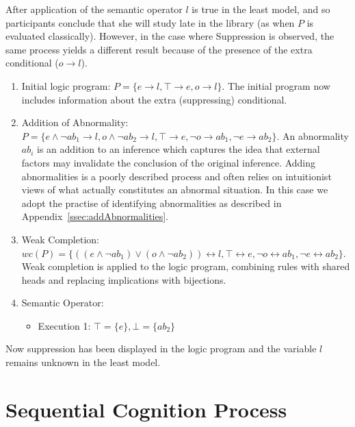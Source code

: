 \documentclass{article}
\begin{document}
After application of the semantic operator $l$ is true in the least model, and so participants conclude that she will study late in the library (as when $P$ is evaluated classically). However, in the case where Suppression is observed, the same process yields a different result because of the presence of the extra conditional ($o\rightarrow l$).
\begin{enumerate}
\item Initial logic program: $P = \{e \rightarrow l, \top \rightarrow e, o \rightarrow l \}$. The initial program now includes information about the extra (suppressing) conditional.
\item Addition of Abnormality: $P = \{e \land \lnot ab_1 \rightarrow l, o \land \lnot ab_2 \rightarrow l, \top \rightarrow e, \lnot o \rightarrow ab_1, \lnot e \rightarrow ab_2 \}$. An abnormality $ab_i$ is an addition to an inference which captures the idea that external factors may invalidate the conclusion of the original inference. Adding abnormalities is a poorly described process and often relies on intuitionist views of what actually constitutes an abnormal situation. In this case we adopt the practise of identifying abnormalities as described in Appendix~\ref{ssec:addAbnormalities}.
\item Weak Completion: $wc(P) = \{((e \land \lnot ab_1) \lor (o \land \lnot ab_2)) \leftrightarrow l, \top \leftrightarrow e, \lnot o \leftrightarrow ab_1, \lnot e \leftrightarrow ab_2 \}$. Weak completion is applied to the logic program, combining rules with shared heads and replacing implications with bijections.
\item Semantic Operator:
\begin{itemize}
\item Execution 1: $\top=\{e\}, \bot=\{ab_2\}$
\end{itemize}
\end{enumerate}

Now suppression has been displayed in the logic program and the variable $l$ remains unknown in the least model.

\section{Sequential Cognition Process} \label{sec:scp}
\end{document}
